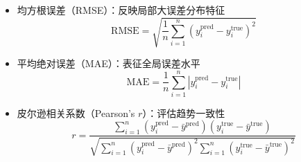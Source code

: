 \begin{itemize}
    \item {均方根误差（RMSE）}：反映局部大误差分布特征
    \begin{equation}
        \text{RMSE} = \sqrt{\frac{1}{n} \sum_{i=1}^{n} \left( y_i^{\text{pred}} - y_i^{\text{true}} \right)^2}
        \label{eq:rmse}
    \end{equation}

    \item{平均绝对误差（MAE）}：表征全局误差水平
    \begin{equation}
        \text{MAE} = \frac{1}{n} \sum_{i=1}^{n} \left| y_i^{\text{pred}} - y_i^{\text{true}} \right|
        \label{eq:mae}
    \end{equation}

    \item{皮尔逊相关系数（Pearson's $r$）}：评估趋势一致性
    \begin{equation}
        r = \frac{\sum_{i=1}^{n} (y_i^{\text{pred}} - \bar{y}^{\text{pred}})(y_i^{\text{true}} - \bar{y}^{\text{true}})}
        {\sqrt{\sum_{i=1}^{n} (y_i^{\text{pred}} - \bar{y}^{\text{pred}})^2 \sum_{i=1}^{n} (y_i^{\text{true}} - \bar{y}^{\text{true}})^2}}
        \label{eq:pearson}
    \end{equation}
\end{itemize}









